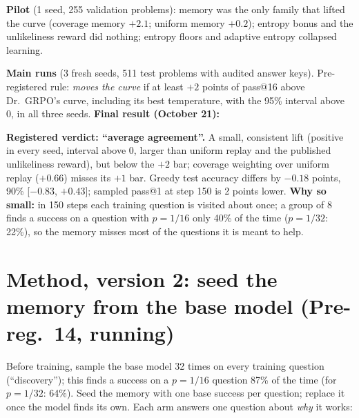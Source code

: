 \documentclass[11pt]{article}
\begin{document}
\textbf{Pilot} (1 seed, 255 validation problems): memory was the only family that lifted the curve (coverage memory $+2.1$; uniform memory $+0.2$); entropy bonus and the unlikeliness reward did nothing; entropy floors and adaptive entropy collapsed learning.

\textbf{Main runs} (3 fresh seeds, 511 test problems with audited answer keys). Pre-registered rule: \emph{moves the curve} if at least $+2$ points of pass@16 above Dr.\ GRPO's curve, including its best temperature, with the 95\% interval above 0, in all three seeds. \textbf{Final result (October 21):}

\begin{center}\small
{}
\end{center}
\textbf{Registered verdict: ``average agreement''.} A small, consistent lift (positive in every seed, interval above 0, larger than uniform replay and the published unlikeliness reward), but below the $+2$ bar; coverage weighting over uniform replay ($+0.66$) misses its $+1$ bar. Greedy test accuracy differs by $-0.18$ points, 90\% [$-0.83$, $+0.43$]; sampled pass@1 at step 150 is 2 points lower. \textbf{Why so small:} in 150 steps each training question is visited about once; a group of 8 finds a success on a question with $p=1/16$ only 40\% of the time ($p=1/32$: 22\%), so the memory misses most of the questions it is meant to help.

\section{Method, version 2: seed the memory from the base model (Pre-reg.\ 14, running)}
Before training, sample the base model 32 times on every training question (``discovery''); this finds a success on a $p=1/16$ question 87\% of the time (for $p=1/32$: 64\%). Seed the memory with one base success per question; replace it once the model finds its own. Each arm answers one question about \emph{why} it works:
\end{document}

